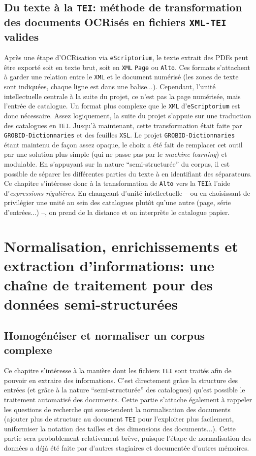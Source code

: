 \documentclass[a4paper, 12pt, twoside]{book}
\newcommand{\alto}{\texttt{Alto}}
\newcommand{\escr}{\texttt{eScriptorium}}
\newcommand{\rgx}{\textit{expressions régulières}}
\newcommand{\tei}{\texttt{TEI}}
\newcommand{\xml}{\texttt{XML}}
\newcommand{\xmltei}{\texttt{XML-TEI}}
\newcommand{\xsl}{\texttt{XSL}}
\begin{document}
\chapter{Du texte à la \tei{}: méthode de transformation des documents OCRisés en fichiers \xmltei{} valides}
Après une étape d'OCRisation via \escr{}, le texte extrait des PDFs peut être exporté soit en texte brut, soit en \xml{} \texttt{Page} ou \alto{}. Ces formats s'attachent à garder une relation entre le \xml{} et le document numérisé (les zones de texte sont indiquées, chaque ligne est dans une balise...). Cependant, l'unité intellectuelle centrale à la suite du projet, ce n'est pas la page numérisée, mais l'entrée de catalogue. Un format plus complexe que le \xml{} d'\escr{} est donc nécessaire. Assez logiquement, la suite du projet s'appuie sur une traduction des catalogues en \tei{}. Jusqu'à maintenant, cette transformation était faite par \texttt{GROBID-Dictionnaries} et des feuilles \xsl{}. Le projet \texttt{GROBID-Dictionnaries} étant maintenu de façon assez opaque, le choix a été fait de remplacer cet outil par une solution plus simple (qui ne passe pas par le \textit{machine learning}) et modulable. En s'appuyant sur la nature \enquote{semi-structurée} du corpus, il est possible de séparer les différentes parties du texte à en identifiant des séparateurs. Ce chapitre s'intéresse donc à la transformation de \alto{} vers la \tei{}à l'aide d'\rgx{}. En changeant d'unité intellectuelle -- ou en choisissant de privilégier une unité au sein des catalogues plutôt qu'une autre (page, série d'entrées...) --, on prend de la distance et on interprète le catalogue papier.




\part{Normalisation, enrichissements et extraction d'informations: une chaîne de traitement pour des données semi-structurées}
\chapter{Homogénéiser et normaliser un corpus complexe}
Ce chapitre s'intéresse à la manière dont les fichiers \tei{} sont traités afin de pouvoir en extraire des informations. C'est directement grâce la structure des entrées (et grâce à la nature \enquote{semi-structurée} des catalogues) qu'est possible le traitement automatisé des documents. Cette partie s'attache également à rappeler les questions de recherche qui sous-tendent la normalisation des documents (ajouter plus de structure au document \tei{} pour l'exploiter plus facilement, uniformiser la notation des tailles et des dimensions des documents...). Cette partie sera probablement relativement brève, puisque l'étape de normalisation des données a déjà été faite par d'autres stagiaires et documentée d'autres mémoires.
\end{document}
